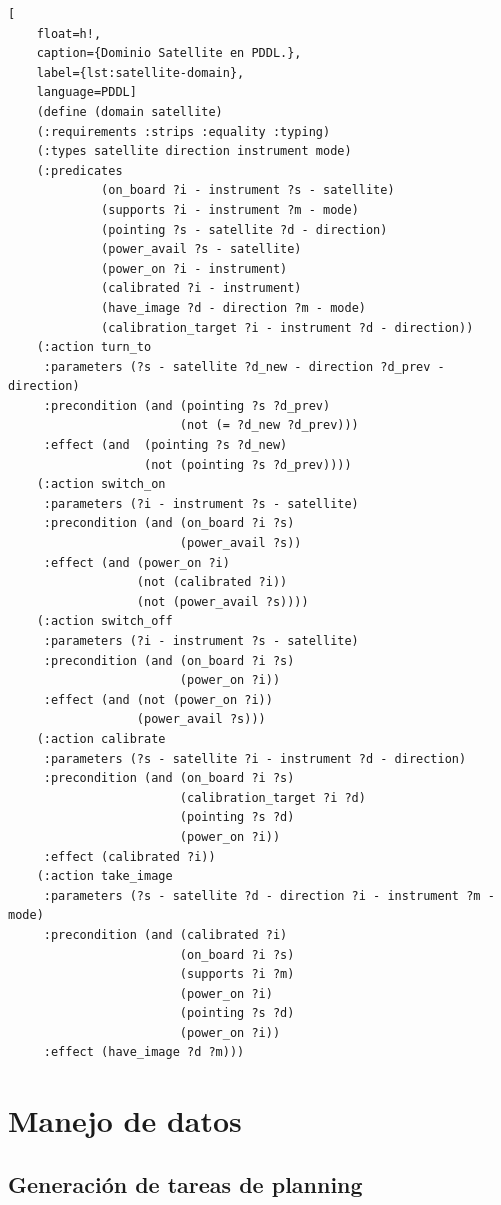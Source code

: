 \begin{lstlisting}[
    float=h!,
    caption={Dominio Satellite en PDDL.},
    label={lst:satellite-domain},
    language=PDDL]
    (define (domain satellite)
    (:requirements :strips :equality :typing)
    (:types satellite direction instrument mode)
    (:predicates 
             (on_board ?i - instrument ?s - satellite)
             (supports ?i - instrument ?m - mode)
             (pointing ?s - satellite ?d - direction)
             (power_avail ?s - satellite)
             (power_on ?i - instrument)
             (calibrated ?i - instrument)
             (have_image ?d - direction ?m - mode)
             (calibration_target ?i - instrument ?d - direction)) 
    (:action turn_to
     :parameters (?s - satellite ?d_new - direction ?d_prev - direction)
     :precondition (and (pointing ?s ?d_prev)
                        (not (= ?d_new ?d_prev)))
     :effect (and  (pointing ?s ?d_new)
                   (not (pointing ?s ?d_prev))))   
    (:action switch_on
     :parameters (?i - instrument ?s - satellite)
     :precondition (and (on_board ?i ?s) 
                        (power_avail ?s))
     :effect (and (power_on ?i)
                  (not (calibrated ?i))
                  (not (power_avail ?s))))  
    (:action switch_off
     :parameters (?i - instrument ?s - satellite)
     :precondition (and (on_board ?i ?s)
                        (power_on ?i))
     :effect (and (not (power_on ?i))
                  (power_avail ?s))) 
    (:action calibrate
     :parameters (?s - satellite ?i - instrument ?d - direction)
     :precondition (and (on_board ?i ?s)
                        (calibration_target ?i ?d)
                        (pointing ?s ?d)
                        (power_on ?i))
     :effect (calibrated ?i))
    (:action take_image
     :parameters (?s - satellite ?d - direction ?i - instrument ?m - mode)
     :precondition (and (calibrated ?i)
                        (on_board ?i ?s)
                        (supports ?i ?m)
                        (power_on ?i)
                        (pointing ?s ?d)
                        (power_on ?i))
     :effect (have_image ?d ?m)))
\end{lstlisting}

\section{Manejo de datos}

\subsection{Generación de tareas de planning}
\label{method:data_generation}

